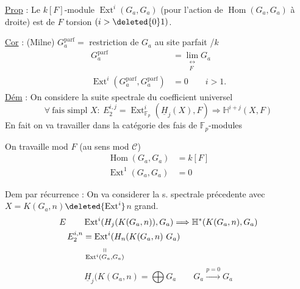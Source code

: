 
\uline{Prop} : Le $k[F]$-module $\operatorname{Ext}^i(G_a,G_a)$ (pour l'action de $\operatorname{Hom}(G_a,G_a)$ à droite) est de $F$ torsion $(i>\deleted{0}1)$.

\uline{Cor} : (Milne) $G_a^\mathrm{parf}=$ restriction de $G_a$ au site parfait /$k$
\[
\begin{aligned}
G_a^\mathrm{parf}&=\lim_{\substack{\longleftrightarrow\\ F}}G_a\\
\operatorname{Ext}^i(G_a^\mathrm{parf},G_a^\mathrm{parf})&=0\qquad i>1.
\end{aligned}
\]
\uline{Dém} : On considere la suite spectrale du coefficient universel
\[
\forall\ \text{fais simpl }X:\ E_2^{i,j}=\operatorname{Ext}^i_{\mathbb F_p}(\underline H_j(X),F)\Longrightarrow \mathbb H^{i+j}(X,F)
\]
En fait on va travailler dans la catégorie des fais de $\mathbb F_p$-modules

On travaille mod $F$ (au sens mod $\mathcal C$)
\[
\begin{aligned}
\operatorname{Hom}(G_a,G_a)&=k[F]\\
\operatorname{Ext}^1(G_a,G_a)&=0
\end{aligned}
\]

Dem par récurrence : On va considerer la s. spectrale précedente avec $X=K(G_a,n)$\qquad $\deleted{\operatorname{Ext}^i}$\quad $n$ grand.
\[
\begin{aligned}
E\qquad&\operatorname{Ext}^i(H_j(K(G_a,n)),G_a)\Longrightarrow \mathbb H^*(K(G_a,n),G_a)\\
E_2^{i,n}&=\operatorname{Ext}^i(H_n(K(G_a,n)\ G_a)\\
&\underset{\operatorname{Ext}^i(G_a,G_a)}{\shortparallel}
\end{aligned}
\]
\[
\underline H_j(K(G_a,n)=\bigoplus G_a\qquad G_a\xrightarrow{p=0}G_a
\]
